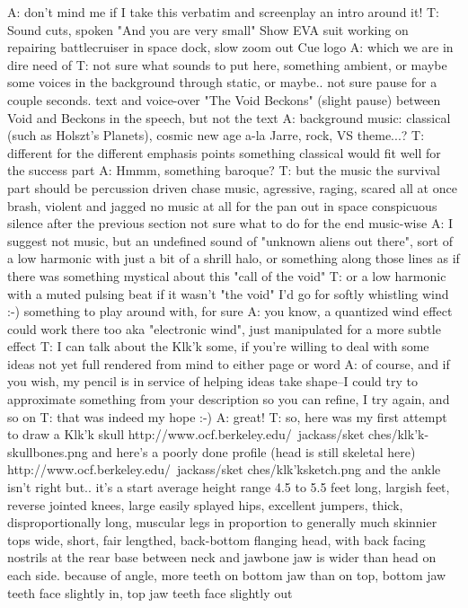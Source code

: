 A: don't mind me if I take this verbatim and screenplay an intro around it!
T: Sound cuts, spoken "And you are very small" Show EVA suit working on repairing battlecruiser in space dock, slow zoom out
Cue logo 
A: which we are in dire need of
T: not sure what sounds to put here, something ambient, or maybe some voices in the background through static, or maybe.. not sure
pause for a couple seconds.
text and voice-over "The Void Beckons" (slight pause) between Void and Beckons in the speech, but not the text
A: background music: classical (such as Holszt's Planets), cosmic new age a-la Jarre, rock, VS theme...?
T: different for the different emphasis points
something classical would fit well for the success part
A: Hmmm, something baroque?
T: but the music the survival part should be percussion driven chase music, agressive, raging, scared all at once
brash, violent and jagged
no music at all for the pan out in space
conspicuous silence after the previous section
not sure what to do for the end music-wise
A: I suggest not music, but an undefined sound of "unknown aliens out there", sort of a low harmonic with just a bit of a shrill halo, or something along those lines
as if there was something mystical about this "call of the void"
T: or a low harmonic with a muted pulsing beat
if it wasn't "the void" I'd go for softly whistling wind :-)
something to play around with, for sure
A: you know, a quantized wind effect could work there too
aka "electronic wind", just manipulated for a more subtle effect
T: I can talk about the Klk'k some, if you're willing to deal with some ideas not yet full rendered from mind to either page or word
A: of course, and if you wish, my pencil is in service of helping ideas take shape--I could try to approximate something from your description
so you can refine, I try again, and so on
T: that was indeed my hope :-)
A: great!
T: so, here was my first attempt to draw a Klk'k skull http://www.ocf.berkeley.edu/~jackass/sket ches/klk'k-skullbones.png
and here's a poorly done profile (head is still skeletal here) http://www.ocf.berkeley.edu/~jackass/sket ches/klk'ksketch.png
and the ankle isn't right
but.. it's a start
average height range 4.5 to 5.5 feet
long, largish feet, reverse jointed knees, large easily splayed hips, excellent jumpers, thick, disproportionally long, muscular legs in proportion to generally much skinnier tops
wide, short, fair lengthed, back-bottom flanging head, with back facing nostrils at the rear base between neck and jawbone
jaw is wider than head on each side. because of angle, more teeth on bottom jaw than on top, bottom jaw teeth face slightly in, top jaw teeth face slightly out
